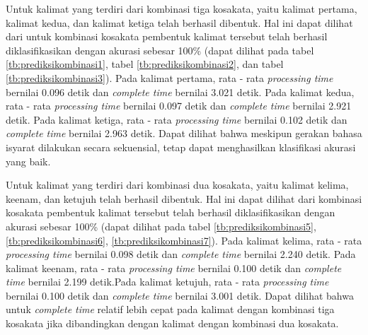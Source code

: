 
Untuk kalimat yang terdiri dari kombinasi tiga kosakata, yaitu kalimat pertama, kalimat kedua, dan kalimat ketiga telah berhasil dibentuk. Hal ini dapat dilihat dari untuk kombinasi kosakata pembentuk kalimat tersebut telah berhasil diklasifikasikan dengan akurasi sebesar 100\% (dapat dilihat pada tabel \ref{tb:prediksikombinasi1}, tabel \ref{tb:prediksikombinasi2}, dan tabel \ref{tb:prediksikombinasi3}). Pada kalimat pertama, rata - rata \emph{processing time} bernilai 0.096 detik dan \emph{complete time} bernilai 3.021 detik. Pada kalimat kedua, rata - rata \emph{processing time} bernilai 0.097 detik dan \emph{complete time} bernilai 2.921 detik. Pada kalimat ketiga, rata - rata \emph{processing time} bernilai 0.102 detik dan \emph{complete time} bernilai 2.963 detik. Dapat dilihat bahwa meskipun gerakan bahasa isyarat dilakukan secara sekuensial, tetap dapat menghasilkan klasifikasi akurasi yang baik.

Untuk kalimat yang terdiri dari kombinasi dua kosakata, yaitu kalimat kelima, keenam, dan ketujuh telah berhasil dibentuk. Hal ini dapat dilihat dari kombinasi kosakata pembentuk kalimat tersebut telah berhasil diklasifikasikan dengan akurasi sebesar 100\% (dapat dilihat pada tabel \ref{tb:prediksikombinasi5}, \ref{tb:prediksikombinasi6}, \ref{tb:prediksikombinasi7}). Pada kalimat kelima, rata - rata \emph{processing time} bernilai 0.098 detik dan \emph{complete time} bernilai 2.240 detik. Pada kalimat keenam, rata - rata \emph{processing time} bernilai 0.100 detik dan \emph{complete time} bernilai 2.199 detik.Pada kalimat ketujuh, rata - rata \emph{processing time} bernilai 0.100 detik dan \emph{complete time} bernilai 3.001 detik. Dapat dilihat bahwa untuk \emph{complete time} relatif lebih cepat pada kalimat dengan kombinasi tiga kosakata jika dibandingkan dengan kalimat dengan kombinasi dua kosakata.

